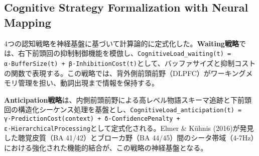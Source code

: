 \subsection{Cognitive Strategy Formalization with Neural Mapping}

4つの認知戦略を神経基盤に基づいて計算論的に定式化した。\textbf{Waiting戦略}では、右下前頭回の抑制制御機能を模倣し、\texttt{CognitiveLoad\_waiting(t) = α·BufferSize(t) + β·InhibitionCost(t)}として、バッファサイズと抑制コストの関数で表現する。この戦略では、背外側前頭前野（DLPFC）がワーキングメモリ管理を担い、動詞出現まで情報を保持する。

\textbf{Anticipation戦略}は、内側前頭前野による高レベル物語スキーマ追跡と下前頭回の構造化シーケンス処理を基盤とし、\texttt{CognitiveLoad\_anticipation(t) = γ·PredictionCost(context) + δ·ConfidencePenalty + ε·HierarchicalProcessing}として定式化される。Elmer \& Kühnis (2016)が発見した聴覚皮質（BA 41/42）とブローカ野（BA 44/45）間のシータ帯域（4-7Hz）における強化された機能的結合が、この戦略の神経基盤となる。 